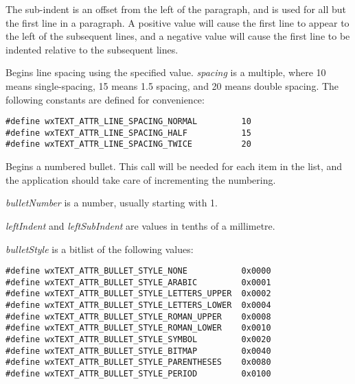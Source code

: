 The sub-indent is an offset from the left of the paragraph, and is used for all but the
first line in a paragraph. A positive value will cause the first line to appear to the left
of the subsequent lines, and a negative value will cause the first line to be indented
relative to the subsequent lines.

\label{wxrichtextbufferbeginlinespacing}


Begins line spacing using the specified value. {\it spacing} is a multiple, where 10 means single-spacing,
15 means 1.5 spacing, and 20 means double spacing. The following constants are
defined for convenience:

{\small
\begin{verbatim}
#define wxTEXT_ATTR_LINE_SPACING_NORMAL         10
#define wxTEXT_ATTR_LINE_SPACING_HALF           15
#define wxTEXT_ATTR_LINE_SPACING_TWICE          20
\end{verbatim}
}

\label{wxrichtextbufferbeginnumberedbullet}


Begins a numbered bullet. This call will be needed for each item in the list, and the
application should take care of incrementing the numbering.

{\it bulletNumber} is a number, usually starting with 1.

{\it leftIndent} and {\it leftSubIndent} are values in tenths of a millimetre.

{\it bulletStyle} is a bitlist of the following values:

{\small
\begin{verbatim}
#define wxTEXT_ATTR_BULLET_STYLE_NONE           0x0000
#define wxTEXT_ATTR_BULLET_STYLE_ARABIC         0x0001
#define wxTEXT_ATTR_BULLET_STYLE_LETTERS_UPPER  0x0002
#define wxTEXT_ATTR_BULLET_STYLE_LETTERS_LOWER  0x0004
#define wxTEXT_ATTR_BULLET_STYLE_ROMAN_UPPER    0x0008
#define wxTEXT_ATTR_BULLET_STYLE_ROMAN_LOWER    0x0010
#define wxTEXT_ATTR_BULLET_STYLE_SYMBOL         0x0020
#define wxTEXT_ATTR_BULLET_STYLE_BITMAP         0x0040
#define wxTEXT_ATTR_BULLET_STYLE_PARENTHESES    0x0080
#define wxTEXT_ATTR_BULLET_STYLE_PERIOD         0x0100
\end{verbatim}
}

